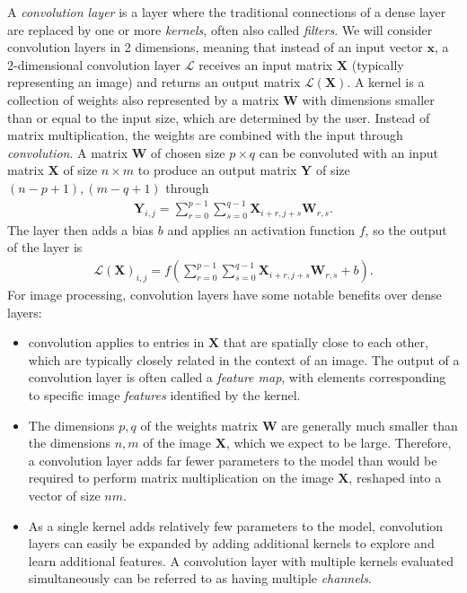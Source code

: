 \documentclass{somasmsc}
\begin{document}
A \textit{convolution layer} is a layer where the traditional connections of a dense layer are replaced by one or more \textit{kernels}, often also called \textit{filters}. We will consider convolution layers in 2 dimensions, meaning that instead of an input vector $\pmb{x}$, a 2-dimensional convolution layer $\mathcal{L}$ receives an input matrix $\mathbf{X}$ (typically representing an image) and returns an output matrix $\mathcal{L}\left(\mathbf{X}\right)$. A kernel is a collection of weights also represented by a matrix $\mathbf{W}$ with dimensions smaller than or equal to the input size, which are determined by the user. Instead of matrix multiplication, the weights are combined with the input through \textit{convolution}. A matrix $\mathbf{W}$ of chosen size $p \times q$ can be convoluted with an input matrix $\mathbf{X}$ of size $n \times m$ to produce an output matrix $\mathbf{Y}$ of size $\left(n-p+1\right),\left(m-q+1\right)$ through
\begin{align*}
\mathbf{Y}_{i,j} = \sum_{r=0}^{p-1} \sum_{s=0}^{q-1} \mathbf{X}_{i+r, j+s} \mathbf{W}_{r,s}.
\end{align*}
The layer then adds a bias $b$ and applies an activation function $f$, so the output of the layer is
\begin{align*}
\mathcal{L}\left(\mathbf{X}\right)_{i,j} = f\left(\sum_{r=0}^{p-1} \sum_{s=0}^{q-1} \mathbf{X}_{i+r, j+s} \mathbf{W}_{r,s} + b\right).
\end{align*}
For image processing, convolution layers have some notable benefits over dense layers:
\begin{itemize}
    \item convolution applies to entries in $\mathbf{X}$ that are spatially close to each other, which are typically closely related in the context of an image. The output of a convolution layer is often called a \textit{feature map}, with elements corresponding to specific image \textit{features} identified by the kernel.
    \item The dimensions $p,q$ of the weights matrix $\mathbf{W}$ are generally much smaller than the dimensions $n, m$ of the image $\mathbf{X}$, which we expect to be large. Therefore, a convolution layer adds far fewer parameters to the model than would be required to perform matrix multiplication on the image $\mathbf{X}$, reshaped into a vector of size $nm$.
    \item As a single kernel adds relatively few parameters to the model, convolution layers can easily be expanded by adding additional kernels to explore and learn additional features. A convolution layer with multiple kernels evaluated simultaneously can be referred to as having multiple \textit{channels}.
\end{itemize}
\end{document}
